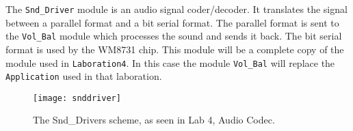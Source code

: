 The \verb?Snd_Driver? module is an audio signal coder/decoder. It translates the signal between a parallel format and a bit serial format. The parallel format is sent to the \verb?Vol_Bal? module which processes the sound and sends it back. The bit serial format is used by the WM8731 chip. This module will be a complete copy of the module used in \verb?Laboration4?. In this case the module \verb?Vol_Bal? will replace the \verb?Application? used in that laboration.

\begin{figure}[H]
  \centering
  \texttt{[image: snddriver]}
  \caption{The Snd\_Drivers scheme, as seen in Lab 4, Audio Codec.}
  \label{fig:sndDriver}
\end{figure}
